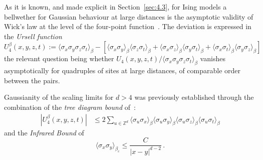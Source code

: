 \documentclass[a4paper,oneside,11pt]{article}
\def\Z{\mathbb{Z}}                          %
\newcommand{\be}[1]{\begin{equation}\label{#1}}
\newcommand{\ee}{\end{equation}}
\numberwithin{equation}{section}
\numberwithin{equation}{section}
\numberwithin{equation}{section}
\def\Z{\mathbb{Z}}                          %
\def\be{\begin{equation}}
\def\ee{\end{equation}}
\begin{document}
% 
 
 
As it is known, and made explicit in Section~\ref{sec:4.3}, for Ising models a bellwether for Gaussian behaviour at large distances  is the asymptotic validity of Wick's law at the level of the four-point  function~\cite{Aiz82,New75}.   The deviation is expressed in the  {\em Ursell function} 
\begin{equation} 
U_4^{\beta}(x,y,z,t)  := \langle\sigma_x\sigma_y\sigma_z\sigma_t\rangle_\beta - \left[ \langle\sigma_x\sigma_y\rangle_\beta\langle\sigma_z\sigma_t\rangle_\beta+\langle\sigma_x\sigma_z\rangle_\beta\langle\sigma_y\sigma_t\rangle_\beta+\langle\sigma_x\sigma_t\rangle_\beta\langle\sigma_y\sigma_z\rangle_\beta    \right] 
\end{equation}
the relevant  question being whether      
$ U_4(x,y,z,t)/ \langle\sigma_x\sigma_y \sigma_z\sigma_t\rangle_\beta$   vanishes asymptotically for quadruples of sites at large distances, of comparable order between the pairs.  



Gaussianity of the scaling limits for $d>4$ was previously established  through the combination of the {\em tree diagram bound} of~\cite{Aiz82}:
 \begin{align} |U_4^\beta(x,y,z,t)|  &\le  2  \sum_{u\in\Z^d} \langle \sigma_u\sigma_x\rangle_\beta  
 \langle \sigma_u\sigma_y\rangle_\beta  
  \langle \sigma_u\sigma_z\rangle_\beta     
   \langle \sigma_u\sigma_t\rangle_\beta \label{tree} 
\end{align} 
and the \emph{Infrared Bound} of~\cite{FroSimSpe76,GliJaf73} 
\be
\langle \sigma_x \sigma_y\rangle_{\beta_c}  \leq  \frac{C}{|x-y|^{d-2}}\,.
\ee  
\end{document}
